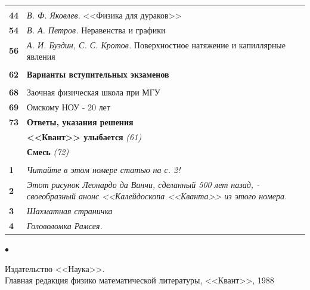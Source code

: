\begin{minipage}[t][][b]{0.55\linewidth}
\begin{tabularx}{\linewidth}{lX}
& \vspace{1dd}{\bf Практикум абитуриента}\\
{\bf 44} & {\itshape В. Ф. Яковлев.} <<Физика для дураков>>\\
{\bf 54} & {\itshape В. А. Петров.} Неравенства и графики\\
{\bf 56} & {\itshape А. И. Буздин, С. С. Кротов.} Поверхностное натяжение и капиллярные явления\\
\vspace{1dd}&\\
{\bf 62} & {\bf Варианты вступительных экзаменов}\\
& \vspace{1dd}{\bf Информация}\\
{\bf 68} & Заочная физическая школа при МГУ\\
{\bf 69} & Омскому НОУ - 20 лет\\
{\bf 73} & {\bf Ответы, указания решения}\\
& {\bf <<Квант>> улыбается} {\it (61)}\\
& {\bf Смесь} {\it (72)}\\
& \vspace{1dd}{\bf Наша обложка}\\
{\bf 1} & {\it Читайте в этом номере статью на с. 2!}\\
{\bf 2} & {\it Этот рисунок Леонардо да Винчи, сделанный 500 лет назад, - своеобразный анонс <<Калейдоскопа <<Кванта>> из этого номера.}\\
{\bf 3} & {\it Шахматная страничка}\\
{\bf 4} & {\it Головоломка Рамсея.}\\
\end{tabularx}
\vspace{1cm}
\medskip
\raggedleft
\begin{minipage}[l]{0.05\linewidth}
{\fontsize{20dd}{6dd}\selectfont $\bullet$}
\end{minipage}%
\raggedright
\begin{minipage}[с]{0.95\linewidth}
\fontsize{6dd}{6dd}\selectfont
\raggedright
\textcopyright Издательство <<Наука>>.\\
Главная редакция физико математической литературы, <<Квант>>, 1988 
\end{minipage}
\end{minipage}
